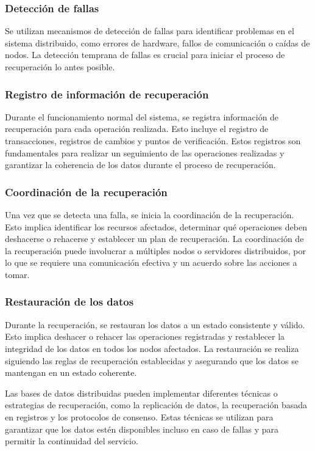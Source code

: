 \subsubsection{Detección de fallas}
\noindent
Se utilizan mecanismos de detección de fallas para identificar problemas en el sistema distribuido, como errores de hardware, fallos de comunicación o caídas de nodos. La detección temprana de fallas es crucial para iniciar el proceso de recuperación lo antes posible.

\subsubsection{Registro de información de recuperación}
\noindent
Durante el funcionamiento normal del sistema, se registra información de recuperación para cada operación realizada. Esto incluye el registro de transacciones, registros de cambios y puntos de verificación. Estos registros son fundamentales para realizar un seguimiento de las operaciones realizadas y garantizar la coherencia de los datos durante el proceso de recuperación.

\subsubsection{Coordinación de la recuperación}
\noindent
Una vez que se detecta una falla, se inicia la coordinación de la recuperación. Esto implica identificar los recursos afectados, determinar qué operaciones deben deshacerse o rehacerse y establecer un plan de recuperación. La coordinación de la recuperación puede involucrar a múltiples nodos o servidores distribuidos, por lo que se requiere una comunicación efectiva y un acuerdo sobre las acciones a tomar.

\subsubsection{Restauración de los datos}
\noindent
Durante la recuperación, se restauran los datos a un estado consistente y válido. Esto implica deshacer o rehacer las operaciones registradas y restablecer la integridad de los datos en todos los nodos afectados. La restauración se realiza siguiendo las reglas de recuperación establecidas y asegurando que los datos se mantengan en un estado coherente.

Las bases de datos distribuidas pueden implementar diferentes técnicas o estrategias de recuperación, como la replicación de datos, la recuperación basada en registros y los protocolos de consenso. Estas técnicas se utilizan para garantizar que los datos estén disponibles incluso en caso de fallas y para permitir la continuidad del servicio.

